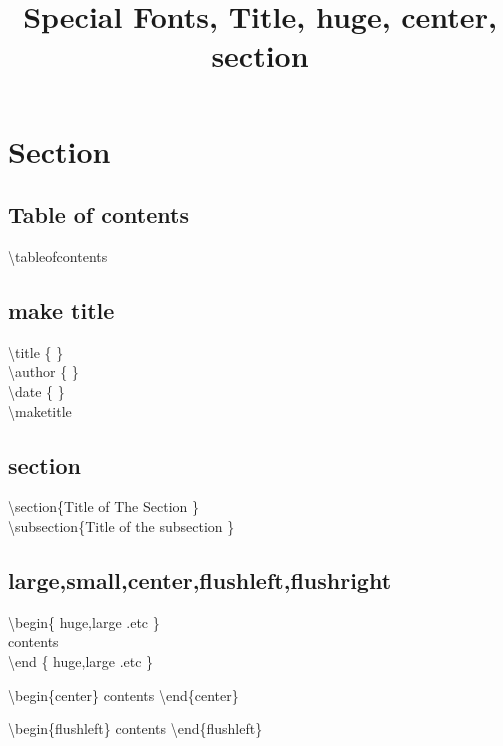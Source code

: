 \documentclass{article}
\begin{document}
\title{Special Fonts, Title, huge, center, section}
\maketitle


\tableofcontents

\section{Section}
    \subsection{Table of contents}
       \begin{huge}\textbackslash tableofcontents\end{huge}
       
    \subsection{make title}
        \textbackslash title \{ \} \\
        \textbackslash author \{ \} \\
        \textbackslash date \{ \} \\
        \textbackslash maketitle
        
    \subsection{section}
        \textbackslash section\{Title of The Section \}\\
        
        \textbackslash subsection\{Title of the subsection \}
    \subsection{large,small,center,flushleft,flushright}
        \textbackslash begin\{ huge,large .etc \}\\
        contents\\
        \textbackslash end \{ huge,large .etc \}\\
        
        
        \begin{center}         
        \textbackslash begin\{center\} contents \textbackslash end\{center\}   
        \end{center}
        
        \begin{flushleft}         
        \textbackslash begin\{flushleft\} contents \textbackslash end\{flushleft\}   
        \end{flushleft}        
        
\end{document}
